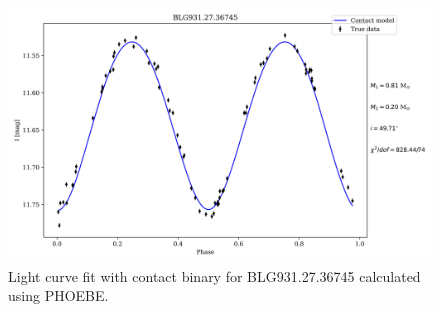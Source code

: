 \documentclass{pracalicmgr}
\begin{document}
\begin{figure}
    \begin{center}
        \includegraphics[scale=0.7]{plots/modeling_phoebe_contact_BLG931.27.36745.jpg}
    \end{center}
    \caption{Light curve fit with contact binary for BLG931.27.36745 calculated using PHOEBE.}\label{lc_plot}
\end{figure}
\end{document}
